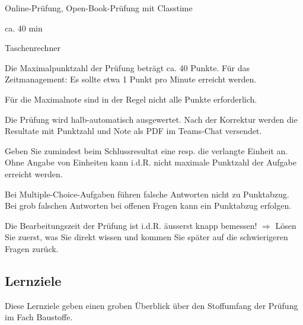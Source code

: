 \begin{description}[leftmargin=!,labelwidth=\widthof{Hinweise zur Bearbeitung...},font=\normalfont]
\item [Prüfungsmodus] Online-Prüfung, Open-Book-Prüfung mit Classtime
\item  [Prüfungsdauer] ca. 40 min
\item [Empfohlene Hilfsmittel] Taschenrechner
\item [Anzahl Punkte] Die Maximalpunktzahl der Prüfung beträgt ca. 40 Punkte. Für das Zeitmanagement: Es sollte etwa 1 Punkt pro Minute erreicht werden. 

Für die Maximalnote sind in der Regel nicht alle Punkte erforderlich.
\item [Bewertung] Die Prüfung wird halb-automatisch ausgewertet. Nach der Korrektur werden die Resultate mit Punktzahl und Note als PDF im Teams-Chat versendet.
\item [Hinweise zur Bearbeitung] Geben Sie zumindest beim Schlussresultat eine resp. die verlangte Einheit an. Ohne Angabe von Einheiten kann i.d.R. nicht maximale Punktzahl der Aufgabe erreicht werden. 

Bei Multiple-Choice-Aufgaben führen falsche Antworten nicht zu Punktabzug. Bei grob falschen Antworten bei offenen Fragen kann ein Punktabzug erfolgen.

Die Bearbeitungszeit der Prüfung ist i.d.R. äusserst knapp bemessen! $\Rightarrow$ Lösen Sie zuerst, was Sie direkt wissen und kommen Sie später auf die schwierigeren Fragen zurück.
\end{description}


\clearpage
\subsection*{Lernziele}
Diese Lernziele geben einen groben Überblick über den Stoffumfang der \nrPruefung\xspace Prüfung im Fach Baustoffe.

%
%
%


%
%

%





